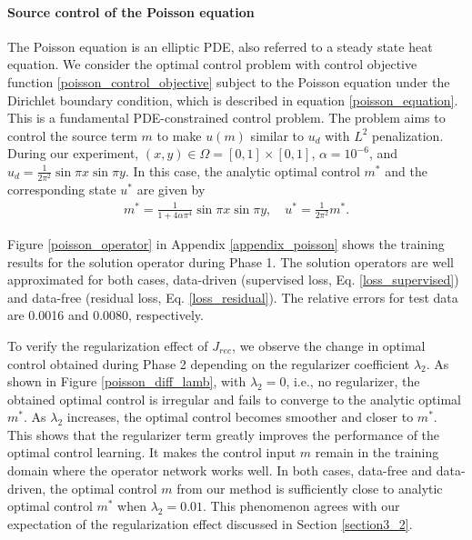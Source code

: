 \documentclass[letterpaper]{article}
\begin{document}
\paragraph{Source control of the Poisson equation}
The Poisson equation is an elliptic PDE, also referred to a steady state heat equation. We consider the optimal control problem with control objective function \eqref{poisson_control_objective} subject to the Poisson equation under the Dirichlet boundary condition, which is described in equation \eqref{poisson_equation}. This is a fundamental PDE-constrained control problem. The problem aims to control the source term $m$ to make $u(m)$ similar to $u_d$ with $L^2$ penalization. During our experiment, $(x,y) \in \Omega = [0, 1]\times [0, 1]$, $\alpha = 10^{-6}$, and $u_d = \frac{1}{2 \pi^2} \sin \pi x \sin \pi y$. In this case, the analytic optimal control $m^*$ and the corresponding state $u^*$ are given by
\begin{align}
  m^* = \frac{1}{1+ 4 \alpha \pi^4} \sin \pi x \sin \pi y, \quad
  u^* = \frac{1}{2 \pi^2} m^*.
\end{align}

Figure \ref{poisson_operator} in Appendix \ref{appendix_poisson} shows the training results for the solution operator during Phase 1. The solution operators are well approximated for both cases, data-driven (supervised loss, Eq. \eqref{loss_supervised}) and data-free (residual loss, Eq. \eqref{loss_residual}). The relative errors for test data are 0.0016 and 0.0080, respectively.

To verify the regularization effect of $J_{rec}$, we observe the change in optimal control obtained during Phase 2 depending on the regularizer coefficient $\lambda_2$. As shown in Figure \ref{poisson_diff_lamb}, with $\lambda_2=0$, i.e., no regularizer, the obtained optimal control is irregular and fails to converge to the analytic optimal $m^*$. As $\lambda_2$ increases, the optimal control becomes smoother and closer to $m^*$. This shows that the regularizer term greatly improves the performance of the optimal control learning. It makes the control input $m$ remain in the training domain where the operator network works well. In both cases, data-free and data-driven, the optimal control $m$ from our method is sufficiently close to analytic optimal control $m^*$ when $\lambda_2=0.01$. This phenomenon agrees with our expectation of the regularization effect discussed in Section \ref{section3_2}.
\end{document}
